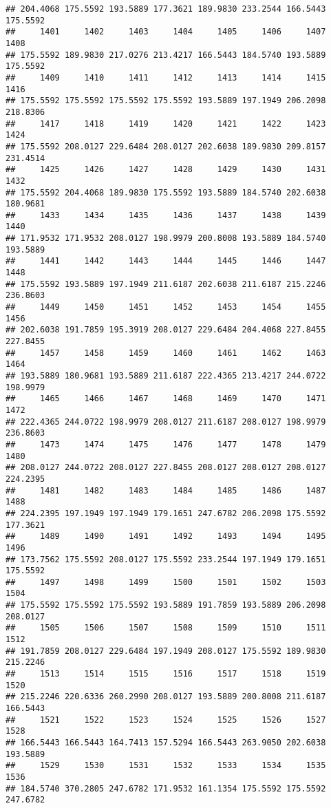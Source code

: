 \documentclass[
]{article}
\begin{document}
\begin{verbatim}
## 204.4068 175.5592 193.5889 177.3621 189.9830 233.2544 166.5443 175.5592 
##     1401     1402     1403     1404     1405     1406     1407     1408 
## 175.5592 189.9830 217.0276 213.4217 166.5443 184.5740 193.5889 175.5592 
##     1409     1410     1411     1412     1413     1414     1415     1416 
## 175.5592 175.5592 175.5592 175.5592 193.5889 197.1949 206.2098 218.8306 
##     1417     1418     1419     1420     1421     1422     1423     1424 
## 175.5592 208.0127 229.6484 208.0127 202.6038 189.9830 209.8157 231.4514 
##     1425     1426     1427     1428     1429     1430     1431     1432 
## 175.5592 204.4068 189.9830 175.5592 193.5889 184.5740 202.6038 180.9681 
##     1433     1434     1435     1436     1437     1438     1439     1440 
## 171.9532 171.9532 208.0127 198.9979 200.8008 193.5889 184.5740 193.5889 
##     1441     1442     1443     1444     1445     1446     1447     1448 
## 175.5592 193.5889 197.1949 211.6187 202.6038 211.6187 215.2246 236.8603 
##     1449     1450     1451     1452     1453     1454     1455     1456 
## 202.6038 191.7859 195.3919 208.0127 229.6484 204.4068 227.8455 227.8455 
##     1457     1458     1459     1460     1461     1462     1463     1464 
## 193.5889 180.9681 193.5889 211.6187 222.4365 213.4217 244.0722 198.9979 
##     1465     1466     1467     1468     1469     1470     1471     1472 
## 222.4365 244.0722 198.9979 208.0127 211.6187 208.0127 198.9979 236.8603 
##     1473     1474     1475     1476     1477     1478     1479     1480 
## 208.0127 244.0722 208.0127 227.8455 208.0127 208.0127 208.0127 224.2395 
##     1481     1482     1483     1484     1485     1486     1487     1488 
## 224.2395 197.1949 197.1949 179.1651 247.6782 206.2098 175.5592 177.3621 
##     1489     1490     1491     1492     1493     1494     1495     1496 
## 173.7562 175.5592 208.0127 175.5592 233.2544 197.1949 179.1651 175.5592 
##     1497     1498     1499     1500     1501     1502     1503     1504 
## 175.5592 175.5592 175.5592 193.5889 191.7859 193.5889 206.2098 208.0127 
##     1505     1506     1507     1508     1509     1510     1511     1512 
## 191.7859 208.0127 229.6484 197.1949 208.0127 175.5592 189.9830 215.2246 
##     1513     1514     1515     1516     1517     1518     1519     1520 
## 215.2246 220.6336 260.2990 208.0127 193.5889 200.8008 211.6187 166.5443 
##     1521     1522     1523     1524     1525     1526     1527     1528 
## 166.5443 166.5443 164.7413 157.5294 166.5443 263.9050 202.6038 193.5889 
##     1529     1530     1531     1532     1533     1534     1535     1536 
## 184.5740 370.2805 247.6782 171.9532 161.1354 175.5592 175.5592 247.6782 

\end{verbatim}
\end{document}
